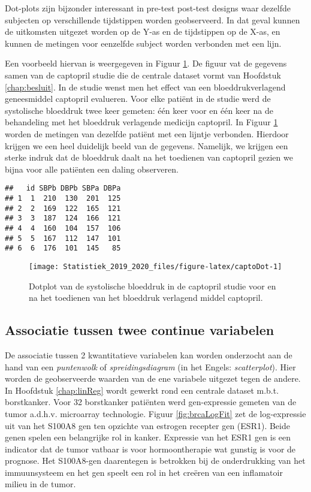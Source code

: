 \documentclass[12pt,dutch,coursenotes]{book}
\theoremstyle{definition}
\theoremstyle{definition}
\theoremstyle{definition}
\theoremstyle{remark}
\begin{document}
Dot-plots zijn bijzonder interessant in pre-test post-test designs waar
dezelfde subjecten op verschillende tijdstippen worden geobserveerd. In
dat geval kunnen de uitkomsten uitgezet worden op de Y-as en de
tijdstippen op de X-as, en kunnen de metingen voor eenzelfde subject
worden verbonden met een lijn.

Een voorbeeld hiervan is weergegeven in Figuur \ref{fig:captoDot}. De
figuur vat de gegevens samen van de captopril studie die de centrale
dataset vormt van Hoofdstuk \ref{chap:besluit}. In de studie wenst men
het effect van een bloeddrukverlagend geneesmiddel captopril evalueren.
Voor elke patiënt in de studie werd de systolische bloeddruk twee keer
gemeten: één keer voor en één keer na de behandeling met het bloeddruk
verlagende medicijn captopril. In Figuur \ref{fig:captoDot} worden de
metingen van dezelfde patiënt met een lijntje verbonden. Hierdoor
krijgen we een heel duidelijk beeld van de gegevens. Namelijk, we
krijgen een sterke indruk dat de bloeddruk daalt na het toedienen van
captopril gezien we bijna voor alle patiënten een daling observeren.

\begin{verbatim}
##   id SBPb DBPb SBPa DBPa
## 1  1  210  130  201  125
## 2  2  169  122  165  121
## 3  3  187  124  166  121
## 4  4  160  104  157  106
## 5  5  167  112  147  101
## 6  6  176  101  145   85
\end{verbatim}

\begin{figure}

{\centering \texttt{[image: Statistiek\_2019\_2020\_files/figure-latex/captoDot-1]} 

}

\caption{Dotplot van de systolische bloeddruk in de captopril studie voor en na het toedienen van het bloeddruk verlagend middel captopril.}\label{fig:captoDot}
\end{figure}

\subsection{Associatie tussen twee continue
variabelen}\label{sec:correlatie}

De associatie tussen 2 kwantitatieve variabelen kan worden onderzocht
aan de hand van een \emph{puntenwolk} of \emph{spreidingsdiagram} (in
het Engels: \emph{scatterplot}). Hier worden de geobserveerde waarden
van de ene variabele uitgezet tegen de andere. In Hoofdstuk
\ref{chap:linReg} wordt gewerkt rond een centrale dataset m.b.t.
borstkanker. Voor 32 borstkanker patiënten werd gen-expressie gemeten
van de tumor a.d.h.v. microarray technologie. Figuur
\ref{fig:brcaLogFit} zet de log-expressie uit van het S100A8 gen ten
opzichte van estrogen recepter gen (ESR1). Beide genen spelen een
belangrijke rol in kanker. Expressie van het ESR1 gen is een indicator
dat de tumor vatbaar is voor hormoontherapie wat gunstig is voor de
prognose. Het S100A8-gen daarentegen is betrokken bij de onderdrukking
van het immuunsysteem en het gen speelt een rol in het creëren van een
inflamatoir milieu in de tumor.
\end{document}
